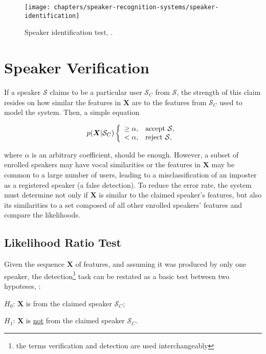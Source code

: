\begin{figure}[ht]
    \centering
    \texttt{[image: chapters/speaker-recognition-systems/speaker-identification]}
    \caption{Speaker identification test, .}
    \label{fig:speaker_identification}
\end{figure}

\section{Speaker Verification}
\label{sec:speaker-verification}

If a speaker $\mathcal{S}$ claims to be a particular user $\mathcal{S}_{C}$ from $\boldsymbol{\mathcal{S}}$, the strength of this claim resides on how similar the features in $\boldsymbol{X}$ are to the features from $\mathcal{S}_{C}$ used to model the system. Then, a simple equation

\begin{equation}
    \postpdf{\boldsymbol{X}}{\mathcal{S}_{C}} \verifytestB{\alpha}{\mathcal{S}}
    \label{eq:decision_speaker_verification}
\end{equation}

\noindent where $\alpha$ is an arbitrary coefficient, should be enough. However, a subset of enrolled speakers may have vocal similarities or the features in $\boldsymbol{X}$ may be common to a large number of users, leading to a misclassification of an imposter as a registered speaker (a false detection). To reduce the error rate, the system must determine not only if $\boldsymbol{X}$ is similar to the claimed speaker's features, but also its similarities to a set composed of all other enrolled speakers' features and compare the likelihoods.

\subsection{Likelihood Ratio Test}

Given the sequence $\boldsymbol{X}$ of features, and assuming it was produced by only one speaker, the detection\footnote{the terms verification and detection are used interchangeably} task can be restated as a basic test between two hypoteses, :

\begin{description}\itemsep0pt
    \item $H_0$: $\boldsymbol{X}$ is from the claimed speaker $\mathcal{S}_{C}$;
    \item $H_1$: $\boldsymbol{X}$ is \underline{not} from the claimed speaker $\mathcal{S}_{C}$.
\end{description}

